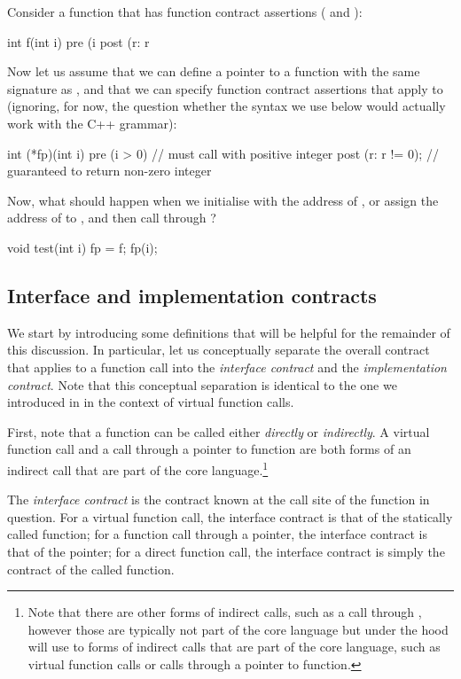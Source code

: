 Consider a function that has function contract assertions ( and ):
\begin{codeblock}
int f(int i)
  pre (i %
  post (r: r %
\end{codeblock}
Now let us assume that we can define a pointer  to a function with the same signature as , and that we can specify function contract assertions that apply to  (ignoring, for now, the question whether the syntax we use below would actually work with the C++ grammar):
\begin{codeblock}
int (*fp)(int i) 
  pre (i > 0)        // must call with positive integer
  post (r: r != 0);  // guaranteed to return non-zero integer
\end{codeblock}
Now, what should happen when we initialise  with the address of , or assign the address of  to , and then call  through ?
\begin{codeblock}  
void test(int i) {
  fp = f;    
  fp(i);
}
\end{codeblock}
\subsection{Interface and implementation contracts}
\label{subsec:interimpl}

We start by introducing some definitions that will be helpful for the remainder of this discussion. In particular, let us conceptually separate the overall contract that applies to a function call into the \emph{interface contract} and the \emph{implementation contract}. Note that this conceptual separation is identical to the one we introduced in \cite{P3097R0} in the context of virtual function calls.

First, note that a function can be called either \emph{directly} or \emph{indirectly}. A virtual function call and a call through a pointer to function are both forms of an indirect call that are part of the core language.\footnote{Note that there are other forms of indirect calls, such as a call through , however those are typically not part of the core language but under the hood will use to forms of indirect calls that are part of the core language, such as virtual function calls or calls through a pointer to function.}

The \emph{interface contract} is the contract known at the call site of the function in question. For a virtual function call, the interface contract is that of the statically called function; for a function call through a pointer, the interface contract is that of the pointer; for a direct function call, the interface contract is simply the contract of the called function.

